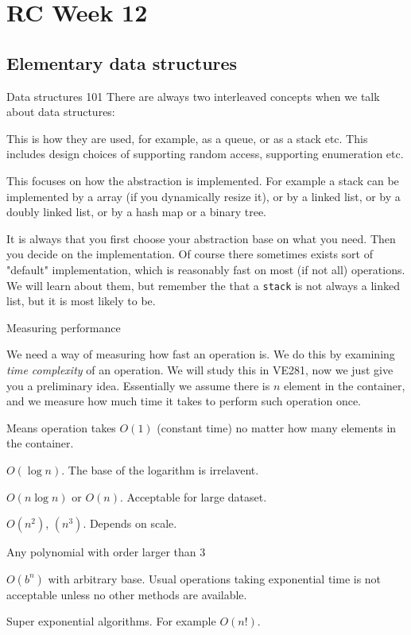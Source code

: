 \section{RC Week 12}
\subsection{Elementary data structures}
\begin{frame}{Data structures 101}
\small
There are always two interleaved concepts when we talk about data structures:
\begin{description}[Implementation]
	\item[Abstraction] This is how they are used, for example, as a queue, or as a stack etc. This includes design choices of supporting random access, supporting enumeration etc.
	\item[Implementation] This focuses on how the abstraction is implemented. For example a stack can be implemented by a array (if you dynamically resize it), or by a linked list, or by a doubly linked list, or by a hash map or a binary tree. 
\end{description}
It is always that you first choose your abstraction base on what you need. Then you decide on the implementation. Of course there sometimes exists sort of "default" implementation, which is reasonably fast on most (if not all) operations. We will learn about them, but remember the that a \texttt{stack} is not always a linked list, but it is most likely to be.
\end{frame}

\begin{frame}{Measuring performance}
\begin{small}
We need a way of measuring how fast an operation is. We do this by examining \textit{time complexity} of an operation. We will study this in VE281, now we just give you a preliminary idea. Essentially we assume there is $n$ element in the container, and we measure how much time it takes to perform such operation once. 
\end{small}
\begin{description}[Exponential]
	\item[Super Fast] Means operation takes $O(1)$ (constant time) no matter how many elements in the container.
	\item[Fast] $O(\log n)$. The base of the logarithm is irrelavent.
	\item[Reasonable] $O(n \log n)$ or $O(n)$. Acceptable for large dataset.
	\item[It depends] $O(n^2)$, $(n^3)$. Depends on scale.
	\item[Emmmm] Any polynomial with order larger than 3
	\item[Exponential] $O(b^n)$ with arbitrary base. Usual operations taking exponential time is not acceptable unless no other methods are available.
	\item[NO!NO!NO!] Super exponential algorithms. For example $O(n!)$.
\end{description}
\end{frame}

